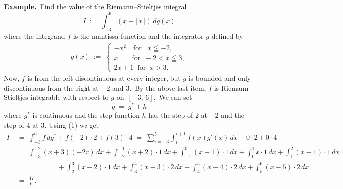 \documentclass[12pt]{article}
\theoremstyle{definition}
\begin{document}
\textbf{Example.}\, Find the value of the Riemann--Stieltjes integral
$$I \;:=\; \int_{-3}^6(x\!-\!\lfloor{x}\rfloor)\,dg(x)$$
where the integrand $f$ is the mantissa function and the integrator $g$ defined by
\begin{align*}
g(x) \;:=\;
\begin{cases}
 -x^2 \quad\mbox{for}\;\;\; x \leqq -2,\\
 x   \qquad\mbox{for}\;\; -\!2 < x \leqq 3,\\
 2x\!+\!1 \;\;\mbox{for}\;\; x > 3.
\end{cases}
\end{align*}
Now, $f$ is from the left discontinuous at every integer, but $g$ is bounded and only discontinuous from the right at $-2$ and 3.\, By the above last item, $f$ is Riemann--Stieltjes integrable with respect to $g$ on\, $[-3,\,6]$.\, We can set
$$g \;=\; g^*\!+\!h$$
where $g^*$ is continuous and the step function $h$ has the step of 2 at $-2$ and the step of 4 at 3.\; Using (1) we get
\begin{align*}
I &\;=\; \int_{-3}^6\!f\,dg^*+f(-2)\cdot2+f(3)\cdot4 \;=\; \sum_{i=-3}^5\int_i^{i+1}\!f(x)g'(x)\,dx+0\cdot2+0\cdot4\\
  &\;=\; \int_{-3}^{-2}(x\!+\!3)(-2x)\,dx+\int_{-2}^{-1}(x\!+\!2)\cdot1\,dx+\int_{-1}^0(x\!+\!1)\cdot1\,dx+
\int_0^1x\cdot1\,dx+\int_1^2(x\!-\!1)\cdot1\,dx\\
& \qquad\qquad\qquad +\int_2^3(x\!-\!2)\cdot1\,dx+\int_3^4(x\!-\!3)\cdot2\,dx+\int_4^5(x\!-\!4)\cdot2\,dx+\int_5^6(x\!-\!5)\cdot2\,dx\\ 
  &\;=\; \frac{47}{6}.
\end{align*}

\end{document}
